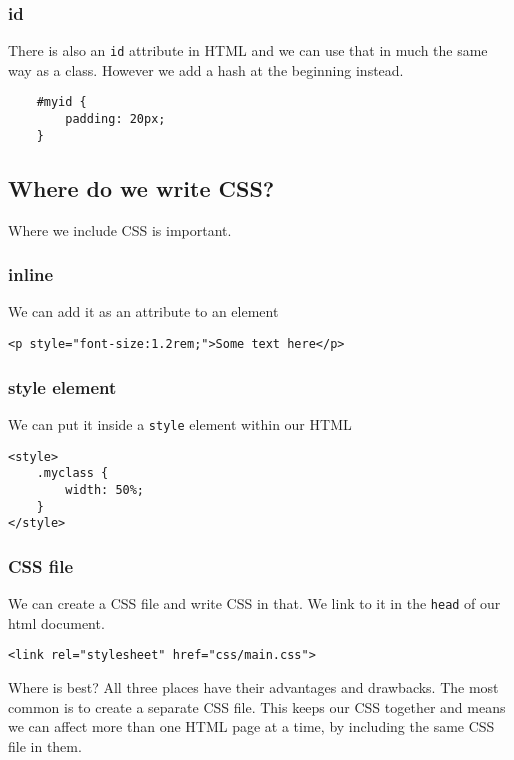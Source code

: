 \subsubsection{id}

There is also an \texttt{id} attribute in HTML and we can use that in much the same way as a class. However we add a hash at the beginning instead.

\begin{verbatim}
    #myid {
        padding: 20px;
    }
\end{verbatim}


\subsection{Where do we write CSS?}

Where we include CSS is important.

\subsubsection{inline}

We can add it as an attribute to an element

\begin{verbatim}
<p style="font-size:1.2rem;">Some text here</p>
\end{verbatim}

\subsubsection{style element}

We can put it inside a \texttt{style} element within our HTML

\begin{verbatim}
<style>
    .myclass {
        width: 50%;
    }
</style>
\end{verbatim}

\subsubsection{CSS file}

We can create a CSS file and write CSS in that. We link to it in the \texttt{head} of our html document.

\begin{verbatim}
<link rel="stylesheet" href="css/main.css">
\end{verbatim}


\begin{infobox}{Where is best?}
    All three places have their advantages and drawbacks. The most common is to create a separate CSS file. This keeps our CSS together and means we can affect more than one HTML page at a time, by including the same CSS file in them.
\end{infobox}

